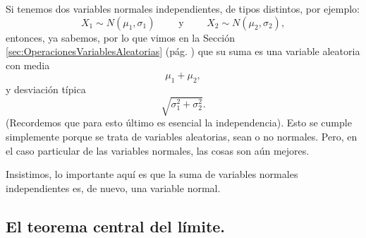 Si tenemos dos variables normales independientes, de tipos distintos, por ejemplo:
\[X_1\sim N(\mu_1,\sigma_1)\qquad \mbox{ y }\qquad X_2\sim N(\mu_2,\sigma_2),\]
entonces, ya sabemos, por lo que vimos en la Sección \ref{sec:OperacionesVariablesAleatorias} (pág. \pageref{sec:OperacionesVariablesAleatorias}) que su suma es una variable aleatoria con media
\[\mu_1+\mu_2,\]
y desviación típica
\[\sqrt{\sigma_1^2+\sigma_2^2}.\]
(Recordemos que para esto último es esencial la independencia). Esto se cumple simplemente porque se trata de variables aleatorias, sean o no normales. Pero, en el caso particular de las variables normales, las cosas son aún mejores.
    \begin{center}
    \end{center}
Insistimos, lo importante aquí es que la suma de variables normales independientes es, de nuevo, una variable normal.

\subsection{El teorema central del límite.}
\label{sec:teoremaCentralLimitePrimeraVersion}

